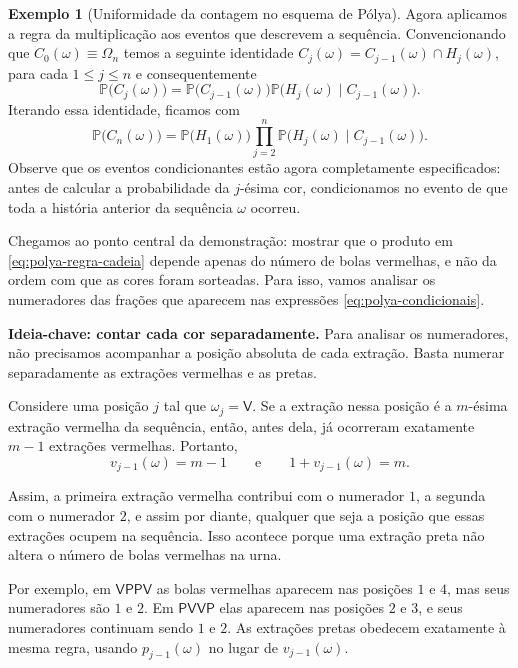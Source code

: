 \documentclass[12pt,portuguese]{article}
\theoremstyle{definition}
\newtheorem{example}[example]{Exemplo}
\begin{document}
\begin{example}[Uniformidade da contagem no esquema de Pólya]
Agora aplicamos a regra da multiplicação aos eventos que descrevem a sequência. 
Convencionando que $C_{0}(\omega)\equiv \Omega_n$
temos a seguinte identidade
$C_j(\omega)=C_{j-1}(\omega)\cap H_j(\omega)$, para cada $1\leqslant j\leqslant n$
e consequentemente 
\[
  \mathbb{P}\big(C_j(\omega)\big)
  =\mathbb{P}\big(C_{j-1}(\omega)\big)
   \mathbb{P}\big(H_j(\omega)\mid C_{j-1}(\omega)\big).
\]
Iterando essa identidade, ficamos com 
\begin{equation}\label{eq:polya-regra-cadeia}
  \mathbb{P}\big(C_n(\omega)\big)
  =\mathbb{P}\big(H_1(\omega)\big)
   \prod_{j=2}^n
   \mathbb{P}\big(H_j(\omega)\mid C_{j-1}(\omega)\big).
\end{equation}
Observe que os eventos condicionantes estão agora completamente especificados: antes de calcular a probabilidade da $j$-ésima cor, condicionamos no evento de que toda a história anterior da sequência $\omega$ ocorreu.


\medskip 
Chegamos ao ponto central da demonstração: mostrar que o produto em
\eqref{eq:polya-regra-cadeia} depende apenas do número de bolas vermelhas, 
e não da ordem com que as cores foram sorteadas. Para isso, vamos analisar 
os numeradores das frações que aparecem nas expressões \eqref{eq:polya-condicionais}.

\bigskip
\noindent\textbf{Ideia-chave: contar cada cor separadamente.}
Para analisar os numeradores, não precisamos acompanhar a posição absoluta de
cada extração. Basta numerar separadamente
as extrações vermelhas e as pretas.\par\nopagebreak[4]

Considere uma posição $j$ tal que $\omega_j=\mathsf{V}$. Se a extração nessa
posição é a $m$-ésima extração vermelha da sequência, então, antes dela, já
ocorreram exatamente $m-1$ extrações vermelhas. Portanto,
\[
  v_{j-1}(\omega)=m-1
  \qquad\text{e}\qquad
  1+v_{j-1}(\omega)=m.
\]

Assim, a primeira extração vermelha contribui com o numerador $1$, a segunda
com o numerador $2$, e assim por diante, qualquer que seja a posição que
essas extrações ocupem na sequência. Isso acontece porque uma extração preta
não altera o número de bolas vermelhas na urna.

Por exemplo, em $\mathsf{VPPV}$ as bolas vermelhas aparecem nas posições $1$
e $4$, mas seus numeradores são $1$ e $2$. Em $\mathsf{PVVP}$ elas aparecem
nas posições $2$ e $3$, e seus numeradores continuam sendo $1$ e $2$.
As extrações pretas obedecem exatamente à mesma regra, usando
$p_{j-1}(\omega)$ no lugar de $v_{j-1}(\omega)$.


\end{example}
\end{document}
